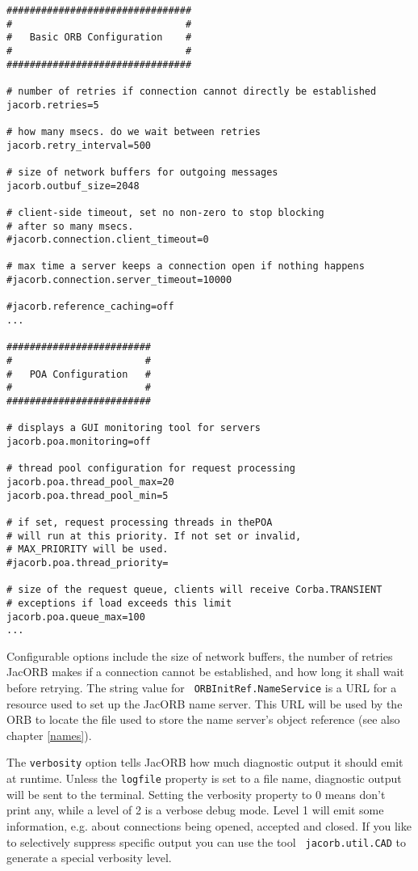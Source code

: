 \documentclass[12pt]{scrbook}
\begin{document}
{\begin{verbatim}
################################
#                              #
#   Basic ORB Configuration    #
#                              #
################################

# number of retries if connection cannot directly be established
jacorb.retries=5

# how many msecs. do we wait between retries
jacorb.retry_interval=500

# size of network buffers for outgoing messages
jacorb.outbuf_size=2048

# client-side timeout, set no non-zero to stop blocking
# after so many msecs.
#jacorb.connection.client_timeout=0

# max time a server keeps a connection open if nothing happens
#jacorb.connection.server_timeout=10000

#jacorb.reference_caching=off
...

#########################
#                       #
#   POA Configuration   #
#                       #
#########################

# displays a GUI monitoring tool for servers
jacorb.poa.monitoring=off

# thread pool configuration for request processing
jacorb.poa.thread_pool_max=20
jacorb.poa.thread_pool_min=5

# if set, request processing threads in thePOA
# will run at this priority. If not set or invalid,
# MAX_PRIORITY will be used.
#jacorb.poa.thread_priority=

# size of the request queue, clients will receive Corba.TRANSIENT
# exceptions if load exceeds this limit
jacorb.poa.queue_max=100
...
\end{verbatim}
}
\renewcommand{\baselinestretch}{1.0}
\small\normalsize

Configurable options  include the size of network  buffers, the number
of retries JacORB makes if a connection cannot be established, and how
long  it  shall wait  before  retrying.   The  string value  for  {\tt
ORBInitRef.NameService} is  a URL  for a resource  used to set  up the
JacORB name  server. This URL  will be used  by the ORB to  locate the
file  used to  store  the  name server's  object  reference (see  also
chapter \ref{names}).

The {\tt verbosity} option tells  JacORB how much diagnostic output it
should emit at runtime. Unless the  {\tt logfile} property is set to a
file name, diagnostic output will  be sent to the terminal. Setting the
verbosity property to 0 means don't print any, while a level of 2 is a
verbose debug mode.   Level 1 will emit some  information, e.g.  about
connections  being  opened,  accepted  and  closed.  If  you  like  to
selectively  suppress  specific  output  you  can  use  the  tool  {\tt
jacorb.util.CAD} to generate a special verbosity level.
\end{document}
